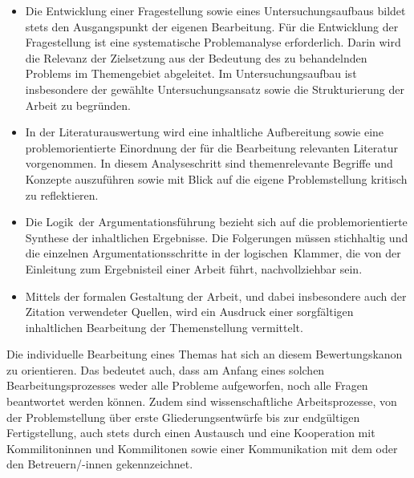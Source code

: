 \documentclass[a4paper, 12pt]{article}
\begin{document}
\begin{itemize}

\item Die Entwicklung einer Fragestellung sowie eines Untersuchungsaufbaus bildet
stets den Ausgangspunkt der eigenen Bearbeitung. F\"{u}r die Entwicklung der
Fragestellung ist eine systematische Problemanalyse erforderlich. Darin wird die
Relevanz der Zielsetzung aus der Bedeutung des zu behandelnden Problems im
Themengebiet abgeleitet. Im Untersuchungsaufbau ist insbesondere der gew\"{a}hlte
Untersuchungsansatz sowie die Strukturierung der Arbeit zu begr\"{u}nden.

\item In der Literaturauswertung wird eine inhaltliche Aufbereitung sowie eine
problemorientierte Einordnung der f\"{u}r die Bearbeitung relevanten Literatur
vorgenommen. In diesem Analyseschritt sind themenrelevante Begriffe und Konzepte
auszuf\"{u}hren sowie mit Blick auf die eigene Problemstellung kritisch zu reflektieren.

\item Die \glqq Logik\grqq\ der Argumentationsf\"{u}hrung bezieht sich auf die
problemorientierte Synthese der inhaltlichen Ergebnisse. Die Folgerungen m\"{u}ssen
stichhaltig und die einzelnen Argumentationsschritte in der \glqq logischen\grqq\
Klammer, die von der Einleitung zum Ergebnisteil einer Arbeit f\"{u}hrt, nachvollziehbar
sein.

\item Mittels der formalen Gestaltung der Arbeit, und dabei insbesondere auch der
Zitation verwendeter Quellen, wird ein Ausdruck einer sorgf\"{a}ltigen inhaltlichen
Bearbeitung der Themenstellung vermittelt.

\end{itemize}

Die individuelle Bearbeitung eines Themas hat sich an diesem Bewertungskanon zu
orientieren. Das bedeutet auch, dass am Anfang eines solchen Bearbeitungsprozesses
weder alle Probleme aufgeworfen, noch alle Fragen beantwortet werden k\"{o}nnen. Zudem
sind wissenschaftliche Arbeitsprozesse, von der Problemstellung \"{u}ber erste
Gliederungsentw\"{u}rfe bis zur endg\"{u}ltigen Fertigstellung, auch stets durch einen
Austausch und eine Kooperation mit Kommilitoninnen und Kommilitonen sowie einer
Kommunikation mit dem oder den Betreuern/-innen gekennzeichnet.
\end{document}

